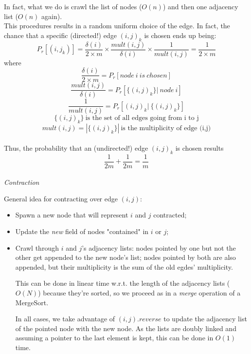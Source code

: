 \documentclass[a4paper]{article}
\begin{document}
In fact, what we do is crawl the list of nodes ($O(n)$) and then one adjacency list ($O(n)$ again).
\\

This procedures results in a random uniform choice of the edge. In fact, the chance that a specific (directed!) edge $(i, j)_k$ is chosen ends up being:
$$P_r[(i,j_k)] = \frac{\delta(i)}{2 \times m} \times \frac{mult(i,j)}{\delta(i)} \times \frac{1}{mult(i,j)} = \frac{1}{2 \times m}$$
where
$$\frac{\delta(i)}{2 \times m} = P_r[node\ i\ is\ chosen]$$
$$\frac{mult(i,j)}{\delta(i)} = P_r[\{(i,j)_k\}|\ node\ i]$$
$$\frac{1}{mult(i,j)} = P_r[(i,j)_k|\ \{(i,j)_k\}]$$
$$\{(i,j)_k\}\ \text{is the set of all edges going from i to j}$$
$$mult(i,j) = |\{(i,j)_k\}|\ \text{is the multiplicity of edge (i,j)}$$
\\

Thus, the probability that an (undirected!) edge $(i,j)_k$ is chosen results
$$\frac{1}{2m} + \frac{1}{2m} = \frac{1}{m}$$
\\
\noindent
\textit{Contraction}

General idea for contracting over edge $(i,j)$:
\begin{itemize}
\item Spawn a new node that will represent $i$ and $j$ contracted;
\item Update the \emph{new} field of nodes "contained" in $i$ or $j$;
\item Crawl through $i$ and $j$'s adjacency lists: nodes pointed by one but not the other get appended to the new node's list; nodes pointed by both are also appended, but their multiplicity is the sum of the old egdes' multiplicity.

This can be done in linear time w.r.t. the length of the adjacency lists ($O(N)$) because they're sorted, so we proceed as in a \emph{merge} operation of a MergeSort.

In all cases, we take advantage of $(i,j).reverse$ to update the adjacency list of the pointed node with the new node. As the lists are doubly linked and assuming a pointer to the last element is kept, this can be done in $O(1)$ time.
\end{itemize}
\end{document}
